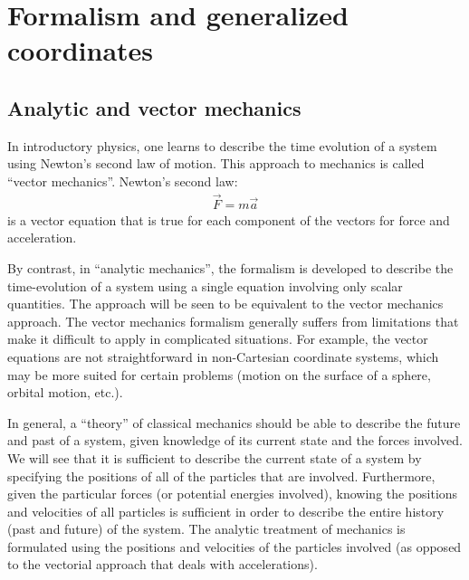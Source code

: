 \chapter{Formalism and generalized coordinates}
\section{Analytic and vector mechanics}
In introductory physics, one learns to describe the time evolution of a system using Newton's second law of motion. This approach to mechanics is called ``vector mechanics''. Newton's second law:
\begin{align}
\vec{F}=m\vec{a}
\label{eqn:Fma}
\end{align}
is a vector equation that is true for each component of the vectors for force and acceleration.

\noindent
By contrast, in ``analytic mechanics'', the formalism is developed to describe the time-evolution of a system using a single equation involving only scalar quantities. The approach will be seen to be equivalent to the vector mechanics approach. The vector mechanics formalism generally suffers from limitations that make it difficult to apply in complicated situations. For example, the vector equations are not straightforward in non-Cartesian coordinate systems, which may be more suited for certain problems (motion on the surface of a sphere, orbital motion, etc.).

\noindent
In general, a ``theory'' of classical mechanics should be able to describe the future and past of a system, given knowledge of its current state and the forces involved. We will see that it is sufficient to describe the current state of a system by specifying the positions of all of the particles that are involved. Furthermore, given the particular forces (or potential energies involved), knowing the positions and velocities of all particles is sufficient in order to describe the entire history (past and future) of the system. The analytic treatment of mechanics is formulated using the positions and velocities of the particles involved (as opposed to the vectorial approach that deals with accelerations).

